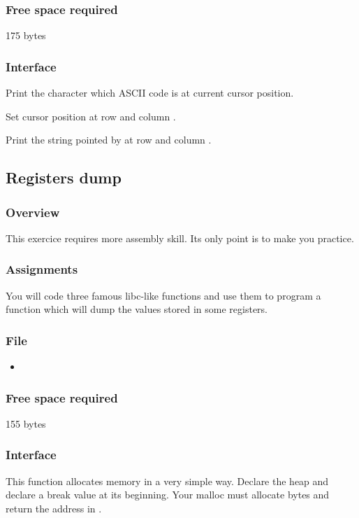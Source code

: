 \subsubsection*{Free space required}
175 bytes

\subsubsection*{Interface}
{
  Print the character which ASCII code is  at current cursor
  position.
}

{
  Set cursor position at row  and column .
}

{
  Print the string pointed by  at row  and
  column .
}

%
%

\newpage

\subsection{Registers dump}

\subsubsection*{Overview}
This exercice requires more assembly skill. Its only point is to make you
practice.

\subsubsection*{Assignments}
You will code three famous libc-like functions and use them to program
a function which will dump the values stored in some registers.

\subsubsection*{File}
\begin{itemize}
  \item {}
\end{itemize}

\subsubsection*{Free space required}
155 bytes

\subsubsection*{Interface}
{
  This function allocates memory in a very simple way. Declare the heap and
  declare a break value at its beginning.
  Your malloc must allocate  bytes and return the address
  in .
}

